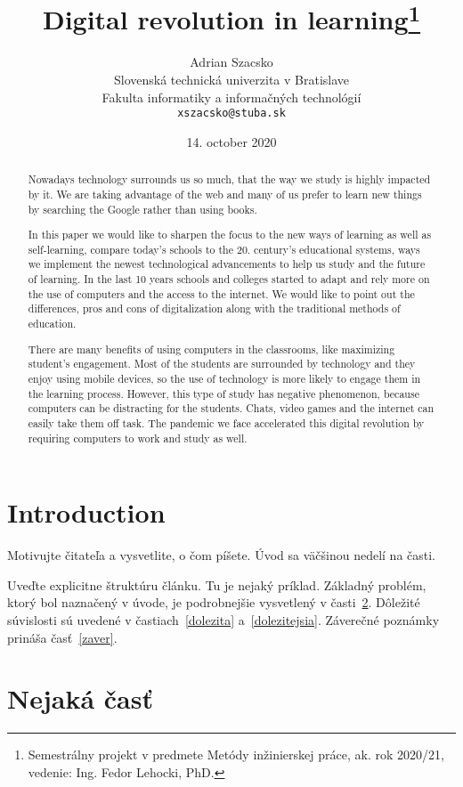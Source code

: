 \documentclass[10pt,twoside,english,a4paper]{article}
\title{Digital revolution in learning\thanks{Semestrálny projekt v predmete Metódy inžinierskej práce, ak. rok 2020/21, vedenie: Ing. Fedor Lehocki, PhD.}} %
\author{Adrian Szacsko\\[2pt]
	{\small Slovenská technická univerzita v Bratislave}\\
	{\small Fakulta informatiky a informačných technológií}\\
	{\small \texttt{xszacsko@stuba.sk}}
	}
\date{\small 14. october 2020} %
\begin{document}
\maketitle

\begin{abstract}
Nowadays technology surrounds us so much, that the way we study is highly impacted
by it. We are taking advantage of the web and many of us prefer to learn new things by
searching the Google rather than using books.

	In this paper we would like to sharpen the focus to the new ways of learning as well as
self-learning, compare today’s schools to the 20. century’s educational systems, ways we
implement the newest technological advancements to help us study and the future of
learning. In the last 10 years schools and colleges started to adapt and rely more on the use
of computers and the access to the internet. We would like to point out the differences, pros
and cons of digitalization along with the traditional methods of education. 

There are many benefits of using computers in the classrooms, like maximizing student’s engagement. Most
of the students are surrounded by technology and they enjoy using mobile devices, so the use
of technology is more likely to engage them in the learning process. However, this type of
study has negative phenomenon, because computers can be distracting for the students.
Chats, video games and the internet can easily take them off task. The pandemic we face
accelerated this digital revolution by requiring computers to work and study as well.
\end{abstract}



\section{Introduction}

Motivujte čitateľa a vysvetlite, o čom píšete. Úvod sa väčšinou nedelí na časti.

Uveďte explicitne štruktúru článku. Tu je nejaký príklad.
Základný problém, ktorý bol naznačený v úvode, je podrobnejšie vysvetlený v časti~\ref{nejaka}.
Dôležité súvislosti sú uvedené v častiach~\ref{dolezita} a~\ref{dolezitejsia}.
Záverečné poznámky prináša časť~\ref{zaver}.



\section{Nejaká časť} \label{nejaka}
\end{document}
